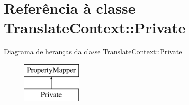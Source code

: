 \hypertarget{class_translate_context_1_1_private}{\section{Referência à classe Translate\-Context\-:\-:Private}
\label{class_translate_context_1_1_private}
}
Diagrama de heranças da classe Translate\-Context\-:\-:Private\begin{figure}[H]
\begin{center}
\leavevmode
\includegraphics[height=2.000000cm]{class_translate_context_1_1_private}
\end{center}
\end{figure}
